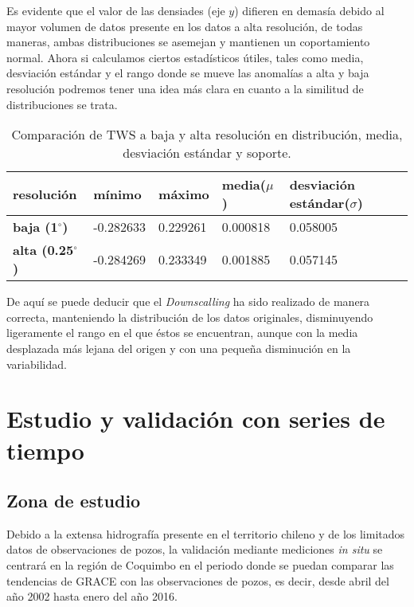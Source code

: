 Es evidente que el valor de las densiades (eje $y$) difieren en demasía debido al mayor volumen de datos presente en los datos a alta resolución, de todas maneras, ambas distribuciones
se asemejan y mantienen un coportamiento normal. Ahora si calculamos ciertos estadísticos útiles, tales como media, desviación estándar y el rango donde se mueve las anomalías a alta y baja resolución podremos tener una idea más clara 
en cuanto a la similitud de distribuciones se trata.

\begin{table}[H] 
    \caption[Comparación de distribuciones de TWS a baja y alta resolución]{Comparación de TWS a baja y alta resolución en distribución, media, desviación estándar y soporte.}
    \begin{tabularx}{0.9\textwidth}{CCCCC}
    \toprule
    \textbf{resolución}	& \textbf{mínimo}	& \textbf{máximo} & \textbf{media($\mu$)} & \textbf{desviación estándar($\sigma$)}\\
        \midrule
        \textbf{baja (1$^{\circ}$)}		& -0.282633 & 0.229261  & 0.000818 & 0.058005\\
        \textbf{alta (0.25$^{\circ}$)}   & -0.284269 & 0.233349	& 0.001885 & 0.057145\\
        \bottomrule
    \end{tabularx}
\end{table}

De aquí se puede deducir que el \textit{Downscalling} ha sido realizado de manera correcta, manteniendo la distribución de los datos originales, disminuyendo ligeramente el rango en el que éstos se encuentran,
aunque con la media desplazada más lejana del origen y con una pequeña disminución en la variabilidad.


%
%
%
%


\section{Estudio y validación con series de tiempo}

\subsection{Zona de estudio}

Debido a la extensa hidrografía presente en el territorio chileno y de los limitados datos de observaciones de pozos, la validación mediante mediciones \textit{in situ} se centrará
en la región de Coquimbo en el periodo donde se puedan comparar las tendencias de GRACE con las observaciones de pozos, es decir, desde abril del año 2002 hasta enero del año 2016. 

